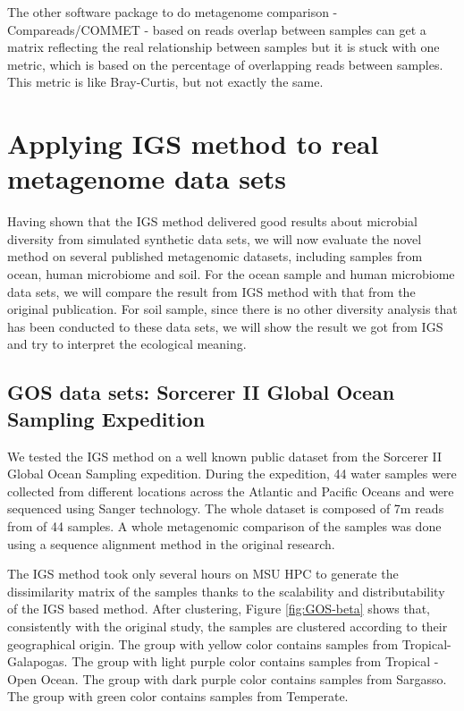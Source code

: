The other software package to do metagenome comparison - Compareads/COMMET -
based on reads overlap between samples can get a matrix 
reflecting the real relationship between samples but it is stuck with one 
metric, which is based on the percentage of overlapping reads between samples. 
This metric is like Bray-Curtis, but not exactly the same.

\section{Applying IGS method to real metagenome data sets}

Having shown that the IGS method delivered good results about microbial diversity 
from simulated synthetic data sets, 
we will now evaluate the novel method on several published metagenomic 
datasets, including samples 
from ocean, human microbiome and soil. For the ocean sample and human microbiome 
data sets, we will compare the result from IGS method
with that from the original publication. For soil sample, since there is no other 
diversity analysis that has been conducted
to these data sets, we will show the result we got from IGS and try to 
interpret the ecological meaning.

\subsection{GOS data sets: Sorcerer II Global Ocean Sampling Expedition}

We tested the IGS method on a well known public dataset from the Sorcerer II 
Global Ocean Sampling expedition.
During the expedition, 44 water samples were collected from different locations across the
Atlantic and Pacific Oceans and were sequenced using Sanger technology. 
The whole dataset is composed of 7m reads from of 44 samples.
A whole metagenomic comparison of the samples was done
using a sequence alignment method in the original research. 

The IGS method took only several hours on MSU HPC to generate the dissimilarity 
matrix of the samples thanks to the scalability and distributability of the IGS 
based method. After clustering, 
Figure \ref{fig:GOS-beta} shows that, consistently with the original study, 
the samples are clustered according to their 
geographical origin. The group with yellow color contains samples from 
Tropical- Galapogas. The group with light purple color
contains samples from Tropical -Open Ocean. The group with dark purple 
color contains samples from Sargasso. The group 
with green color contains samples from Temperate. 


